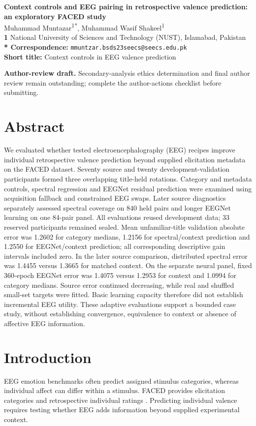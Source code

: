 \documentclass[10pt,letterpaper]{article}
\begin{document}
\begin{flushleft}
{\Large\textbf{Context controls and EEG pairing in retrospective valence prediction: an exploratory FACED study}}\\[12pt]
Muhammad Muntazar\textsuperscript{1*}, Muhammad Wasif Shakeel\textsuperscript{1}\\[8pt]
\textbf{1} National University of Sciences and Technology (NUST), Islamabad, Pakistan\\
\textbf{* Correspondence:} \nolinkurl{mmuntzar.bsds23seecs@seecs.edu.pk}\\
\textbf{Short title:} Context controls in EEG valence prediction
\end{flushleft}
\noindent\textbf{Author-review draft.} Secondary-analysis ethics determination and final author review remain outstanding; complete the author-actions checklist before submitting.
\section*{Abstract}
We evaluated whether tested electroencephalography (EEG) recipes improve individual retrospective valence prediction beyond supplied elicitation metadata on the FACED dataset. Seventy source and twenty development-validation participants formed three overlapping title-held rotations. Category and metadata controls, spectral regression and EEGNet residual prediction were examined using acquisition fallback and constrained EEG swaps. Later source diagnostics separately assessed spectral coverage on 840 held pairs and longer EEGNet learning on one 84-pair panel. All evaluations reused development data; 33 reserved participants remained sealed. Mean unfamiliar-title validation absolute error was 1.2602 for category medians, 1.2156 for spectral/context prediction and 1.2550 for EEGNet/context prediction; all corresponding descriptive gain intervals included zero. In the later source comparison, distributed spectral error was 1.4455 versus 1.3665 for matched context. On the separate neural panel, fixed 360-epoch EEGNet error was 1.4075 versus 1.2953 for context and 1.0994 for category medians. Source error continued decreasing, while real and shuffled small-set targets were fitted. Basic learning capacity therefore did not establish incremental EEG utility. These adaptive evaluations support a bounded case study, without establishing convergence, equivalence to context or absence of affective EEG information.
\linenumbers
\section{Introduction}
EEG emotion benchmarks often predict assigned stimulus categories, whereas individual affect can differ within a stimulus. FACED provides elicitation categories and retrospective individual ratings \cite{chen2023faced}. Predicting individual valence requires testing whether EEG adds information beyond supplied experimental context.
\end{document}
